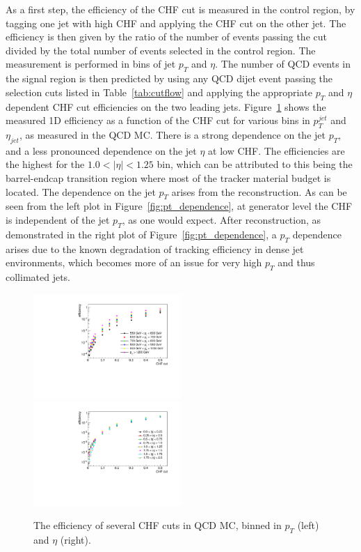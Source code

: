 As a first step, the efficiency of the CHF cut is measured in the control region, by tagging one jet with high CHF and applying the CHF cut on the other jet. The efficiency is then given by the ratio of the number of events passing the cut divided by the total number of events selected in the control region. The measurement is performed in bins of jet $p_T$ and $\eta$. The number of \acs{QCD} events in the signal region is then predicted by using any \acs{QCD} dijet event passing the selection cuts listed in Table~\ref{tab:cutflow} and applying the appropriate $p_T$ and $\eta$ dependent CHF cut efficiencies on the two leading jets. Figure~\ref{fig:efficiencies} shows the measured 1D efficiency as a function of the CHF cut for various bins in $p_T^{jet}$ and $\eta_{jet}$, as measured in the \ac{QCD} MC. There is a strong dependence on the jet $p_T$, and a less pronounced dependence on the jet $\eta$ at low CHF. The efficiencies are the highest for the $1.0 < |\eta| < 1.25$ bin, which can be attributed to this being the barrel-endcap transition region where most of the tracker material budget is located. The dependence on the jet $p_T$ arises from the reconstruction. As can be seen from the left plot in Figure~\ref{fig:pt_dependence}, at generator level the CHF is independent of the jet $p_T$, as one would expect. After reconstruction, as demonstrated in the right plot of Figure~\ref{fig:pt_dependence}, a $p_T$ dependence arises due to the known degradation of tracking efficiency in dense jet environments, which becomes more of an issue for very high $p_T$ and thus collimated jets.

\begin{figure}[ht]
  \centering
  \includegraphics[width=0.5\textwidth]{figures/eff1D_pt_newtrigger.pdf}\hfill%
  \includegraphics[width=0.5\textwidth]{figures/eff1D_eta_newtrigger.pdf}
  \caption{The efficiency of several CHF cuts in \acs{QCD} MC, binned in $p_T$ (left) and $\eta$ (right).}
  \label{fig:efficiencies}
\end{figure}

